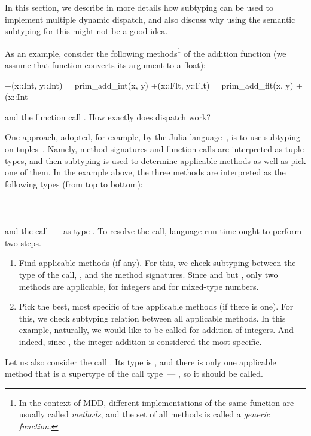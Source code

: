 In this section, we describe in more details how subtyping
can be used to implement multiple dynamic dispatch,
and also discuss why using the semantic subtyping for this
might not be a good idea.

As an example, consider the following methods\footnote{In the context of MDD, 
	different implementations of 
	the same function are usually called \emph{methods},
	and the set of all methods is called a \emph{generic function}.}
of the addition function (we assume that function  
converts its argument to a float):
\begin{lstminijl}
+(x::Int, y::Int) = prim_add_int(x, y) 
+(x::Flt, y::Flt) = prim_add_flt(x, y) 
+(x::Int%
\end{lstminijl}
and the function call .
How exactly does dispatch work?

One approach, adopted, for example, 
by the Julia language~\cite{Bezanson2015AbstractionIT}, 
is to use subtyping on tuples~\cite{bib:Leavens:1998:mddtuples}.
Namely, method signatures and function calls are interpreted as tuple types,
and then subtyping is used to determine applicable methods 
as well as pick one of them.
In the example above, the three methods are interpreted 
as the following types (from top to bottom):\\
\\
\\
\\
and the call~--- as type .
To resolve the call, language run-time ought to perform two steps.
\begin{enumerate}
  \item Find applicable methods (if any). For this, we check subtyping between
    the type of the call, , and the method signatures.
    Since  and  but
    , only two methods are applicable,
     for integers and  for mixed-type numbers.
  \item Pick the best, most specific of the applicable methods
    (if there is one).
    For this, we check subtyping relation between all applicable methods.
    In this example, naturally, we would like  to be called
    for addition of integers. And indeed, since ,
    the integer addition is considered the most specific.
\end{enumerate}
Let us also consider the call . Its type is
, and there is only one applicable method that is
a supertype of the call type~--- , so it should be called.

